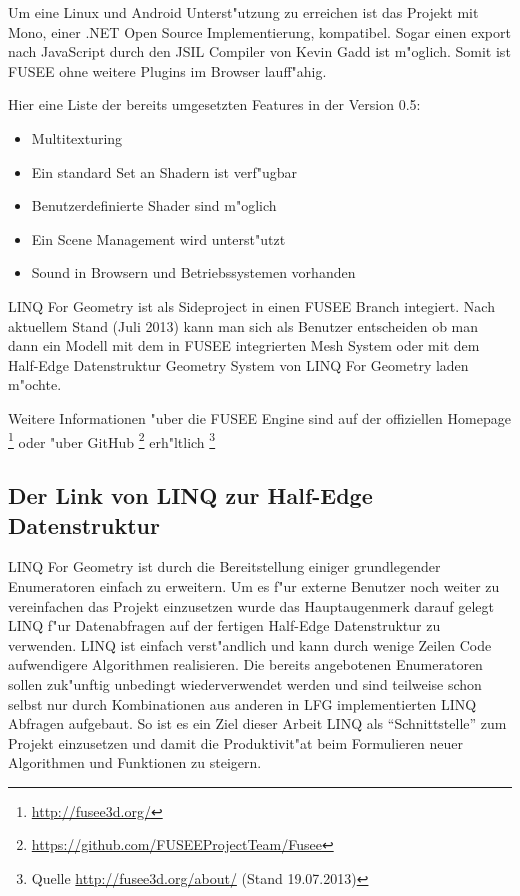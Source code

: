 \documentclass[pagesize, paper=a4, fontsize=12pt,titlepage=true, headings=small, headnosepline, abstractoff, liststotoc, nochapterprefix, plainheadsepline]{scrreprt}
\newcommand{\LFGS}{LINQ For Geometry }
\newcommand{\HES}{Half-Edge Datenstruktur }
\begin{document}
Um eine Linux und Android Unterst"utzung zu erreichen ist das Projekt mit Mono, einer .NET Open Source Implementierung, kompatibel. Sogar einen export nach JavaScript durch den JSIL Compiler von Kevin Gadd ist m"oglich. Somit ist FUSEE ohne weitere Plugins im Browser lauff"ahig.

Hier eine Liste der bereits umgesetzten Features in der Version 0.5:
\begin{itemize}
\item Multitexturing
\item Ein standard Set an Shadern ist verf"ugbar
\item Benutzerdefinierte Shader sind m"oglich
\item Ein Scene Management wird unterst"utzt
\item Sound in Browsern und Betriebssystemen vorhanden
\end{itemize}

\LFGS ist als Sideproject in einen FUSEE Branch integiert. Nach aktuellem Stand (Juli 2013) kann man sich als Benutzer entscheiden ob man dann ein Modell mit dem in FUSEE integrierten Mesh System oder mit dem \HES Geometry System von \LFGS laden m"ochte.

Weitere Informationen "uber die FUSEE Engine sind auf der offiziellen Homepage \footnote[1]{\url{http://fusee3d.org/}} oder "uber GitHub \footnote[2]{\url{https://github.com/FUSEEProjectTeam/Fusee}} erh"ltlich \footnote[3]{Quelle \url{http://fusee3d.org/about/} (Stand 19.07.2013)}
\subsection {Der Link von LINQ zur \HES}
				\LFGS ist durch die Bereitstellung einiger grundlegender Enumeratoren einfach zu erweitern. Um es f"ur externe Benutzer noch weiter zu vereinfachen das Projekt einzusetzen wurde das Hauptaugenmerk darauf gelegt LINQ f"ur Datenabfragen auf der fertigen \HES zu verwenden. LINQ ist einfach verst"andlich und kann durch wenige Zeilen Code aufwendigere Algorithmen realisieren. Die bereits angebotenen Enumeratoren sollen zuk"unftig unbedingt wiederverwendet werden und sind teilweise schon selbst nur durch Kombinationen aus anderen in LFG implementierten LINQ Abfragen aufgebaut. So ist es ein Ziel dieser Arbeit LINQ als "`Schnittstelle"' zum Projekt einzusetzen und damit die Produktivit"at beim Formulieren neuer Algorithmen und Funktionen zu steigern.
\end{document}
